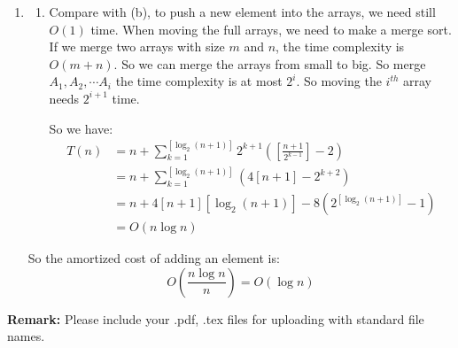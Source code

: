 \documentclass[12pt,a4paper]{article}
\makeatletter
\newtheorem*{solution}{Solution}
\theoremstyle{definition}
\renewenvironment{solution}[1][Solution] {\par\pushQED{\qed}\normalfont\topsep6\p@\@plus6\p@\relax\trivlist\item[\hskip\labelsep\bfseries#1\@addpunct{.}]\ignorespaces}{\popQED\endtrivlist\@endpefalse} \makeatother
\makeatother
\begin{document}
\begin{enumerate}
\begin{solution}
\begin{enumerate}
\item Compare with (b), to push a new element into the arrays, we need still $O(1)$ time. When moving the full arrays, we need to make a merge sort. If we merge two arrays with size $m$ and $n$, the time complexity is $O(m+n)$. So we can merge the arrays from small to big. So merge $A_1,A_2,\cdots A_i$ the time complexity is at most $2^i$. So moving the $i^{th}$ array needs $2^{i+1}$ time. 

So we have:
 \begin{align*}
 T(n) &= n+\sum_{k=1}^{[\log_{2} (n+1)]}2^{k+1}([\frac{n+1}{2^{k-1}}]-2)\\
 &= n+\sum_{k=1}^{[\log_{2} (n+1)]}(4[n+1]-2^{k+2})\\
 &= n+4[n+1][\log_{2} (n+1)]-8(2^{[\log_{2} (n+1)]}-1)\\
 &= O(n\log n) 
 \end{align*}

\end{enumerate}
 So the amortized cost of adding an element is: $$O(\frac{n\log n}{n}) = O(\log n)$$
\end{solution}
\end{enumerate}


\textbf{Remark:} Please include your .pdf, .tex files for uploading with standard file names.


\end{document}
